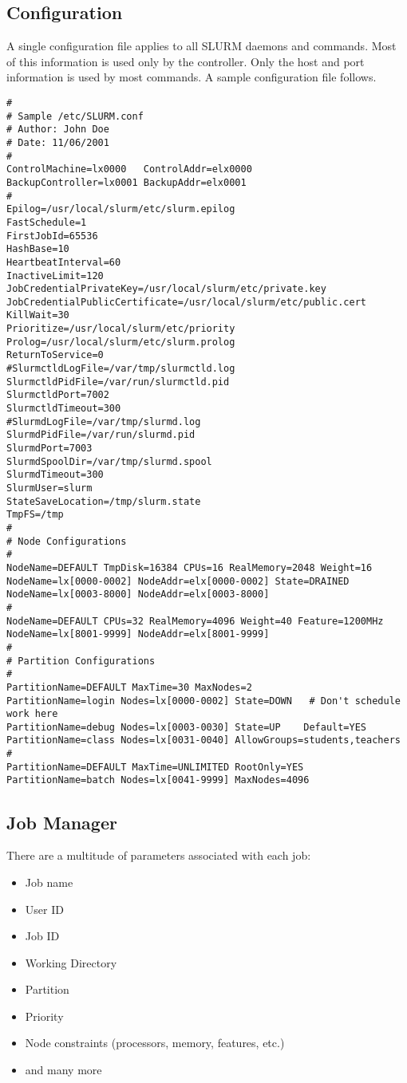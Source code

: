 \subsection{Configuration}

A single configuration file applies to all SLURM daemons and commands.
Most of this information is used only by the controller. 
Only the host and port information is used by most commands.
A sample configuration file follows.

\begin{verbatim}
# 
# Sample /etc/SLURM.conf
# Author: John Doe
# Date: 11/06/2001
#
ControlMachine=lx0000   ControlAddr=elx0000 
BackupController=lx0001 BackupAddr=elx0001
#
Epilog=/usr/local/slurm/etc/slurm.epilog
FastSchedule=1
FirstJobId=65536
HashBase=10
HeartbeatInterval=60
InactiveLimit=120
JobCredentialPrivateKey=/usr/local/slurm/etc/private.key
JobCredentialPublicCertificate=/usr/local/slurm/etc/public.cert
KillWait=30
Prioritize=/usr/local/slurm/etc/priority
Prolog=/usr/local/slurm/etc/slurm.prolog
ReturnToService=0
#SlurmctldLogFile=/var/tmp/slurmctld.log
SlurmctldPidFile=/var/run/slurmctld.pid
SlurmctldPort=7002
SlurmctldTimeout=300
#SlurmdLogFile=/var/tmp/slurmd.log
SlurmdPidFile=/var/run/slurmd.pid
SlurmdPort=7003
SlurmdSpoolDir=/var/tmp/slurmd.spool
SlurmdTimeout=300
SlurmUser=slurm
StateSaveLocation=/tmp/slurm.state
TmpFS=/tmp
#
# Node Configurations
#
NodeName=DEFAULT TmpDisk=16384 CPUs=16 RealMemory=2048 Weight=16
NodeName=lx[0000-0002] NodeAddr=elx[0000-0002] State=DRAINED
NodeName=lx[0003-8000] NodeAddr=elx[0003-8000]
#
NodeName=DEFAULT CPUs=32 RealMemory=4096 Weight=40 Feature=1200MHz
NodeName=lx[8001-9999] NodeAddr=elx[8001-9999]
#
# Partition Configurations
#
PartitionName=DEFAULT MaxTime=30 MaxNodes=2
PartitionName=login Nodes=lx[0000-0002] State=DOWN   # Don't schedule work here
PartitionName=debug Nodes=lx[0003-0030] State=UP    Default=YES
PartitionName=class Nodes=lx[0031-0040] AllowGroups=students,teachers
#
PartitionName=DEFAULT MaxTime=UNLIMITED RootOnly=YES
PartitionName=batch Nodes=lx[0041-9999] MaxNodes=4096
\end{verbatim}

\subsection{Job Manager}

There are a multitude of parameters associated with each job:
\begin{itemize}
\item Job name
\item User ID
\item Job ID
\item Working Directory
\item Partition
\item Priority
\item Node constraints (processors, memory, features, etc.)
\item and many more
\end{itemize}

